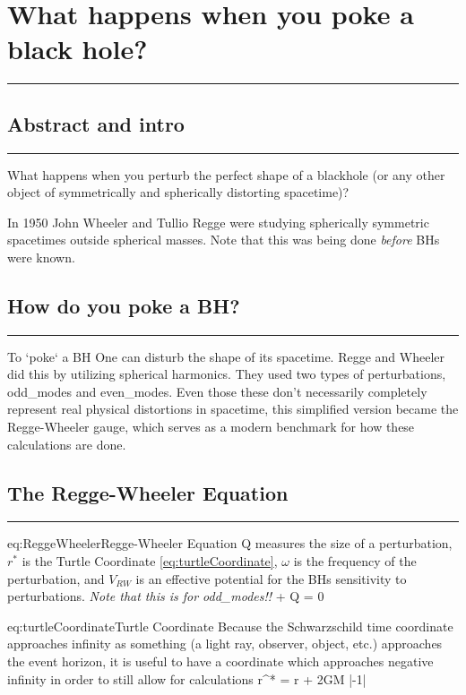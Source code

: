 \pagebreak
\chapter{What happens when you poke a black hole? \cite{Mittal2026} \label{chap:PokeABH}}
\hrule
\vspace{.5cm}

\section{Abstract and intro}
\hrule
\vspace{.5cm}
What happens when you perturb the perfect shape of a blackhole (or any other object of symmetrically and spherically distorting spacetime)?

In 1950 John Wheeler and Tullio Regge were studying spherically symmetric spacetimes outside spherical masses. Note that this was being done \textit{before} BHs were known.  

\section{How do you poke a BH?}
\hrule
\vspace{.5cm}

To `poke` a BH One can disturb the shape of its spacetime. Regge and Wheeler did this by utilizing spherical harmonics. They used two types of perturbations, \gls{odd_modes} and \gls{even_modes}. Even those these don't necessarily completely represent real physical distortions in spacetime, this simplified version became the Regge-Wheeler gauge, which serves as a modern benchmark for how these calculations are done.

\section{The Regge-Wheeler Equation}
\hrule
\vspace{.5cm}

\begin{eqboxed}{eq:ReggeWheeler}{Regge-Wheeler Equation}
{Q measures the size of a perturbation, \(r^*\) is the Turtle Coordinate \ref{eq:turtleCoordinate}, \(\omega\) is the frequency of the perturbation, and \(V_{RW}\) is an effective potential for the BHs sensitivity to perturbations. \textit{Note that this is for \gls{odd_modes}!!}}
 + Q = 0
\end{eqboxed}

\begin{eqboxed}{eq:turtleCoordinate}{Turtle Coordinate}
{Because the Schwarzschild time coordinate approaches infinity as something (a light ray, observer, object, etc.) approaches the event horizon, it is useful to have a coordinate which approaches negative infinity in order to still allow for calculations}
r^* = r + 2GM \ln\left|-1\right|
\end{eqboxed}

